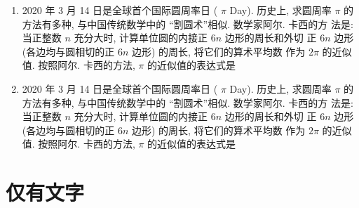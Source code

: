 \documentclass{ctexart}
\begin{document}
\begin{enumerate}
  \item 2020 年 3 月 14 日是全球首个国际圆周率日 ( $\pi$ Day). 历史上, 求圆周率 $\pi$ 的方法有多种, 与中国传统数学中的 “割圆术”相似. 数学家阿尔. 卡西的方 法是: 当正整数 $n$ 充分大时, 计算单位圆的内接正 $6 n$ 边形的周长和外切 正 $6 n$ 边形 (各边均与圆相切的正 $6 n$ 边形) 的周长, 将它们的算术平均数 作为 $2 \pi$ 的近似值. 按照阿尔. 卡西的方法, $\pi$ 的近似值的表达式是 \xparen
  \item 2020 年 3 月 14 日是全球首个国际圆周率日 ( $\pi$ Day). 历史上, 求圆周率 $\pi$ 的方法有多种, 与中国传统数学中的 “割圆术”相似. 数学家阿尔. 卡西的方 法是: 当正整数 $n$ 充分大时, 计算单位圆的内接正 $6 n$ 边形的周长和外切 正 $6 n$ 边形 (各边均与圆相切的正 $6 n$ 边形) 的周长, 将它们的算术平均数 作为 $2 \pi$ 的近似值. 按照阿尔. 卡西的方法, $\pi$ 的近似值的表达式是 \xparen
\end{enumerate}


\section{仅有文字}
\end{document}
